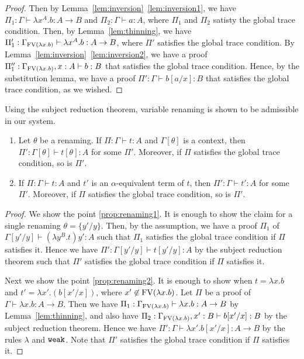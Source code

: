 \begin{proof}
  Then by Lemma~\ref{lem:inversion}~\ref{lem:inversion1},
  we have $\Pi_1:\Gamma \vdash \lambda x^A.b:A\to B$ and $\Pi_2:\Gamma \vdash a:A$,
  where $\Pi_1$ and $\Pi_2$ satisty the global trace condition. 
  Then, by Lemma~\ref{lem:thinning},
  we have $\Pi'_1:\Gamma_{{{\rm FV}}(\lambda x.b)} \vdash \lambda x^A.b:A\to B$,
  where $\Pi'$ satisfies the global trace condition. 
  By Lemma~\ref{lem:inversion}~\ref{lem:inversion2},
  we have a proof $\Pi''_1:\Gamma_{{{\rm FV}}(\lambda x.b)},x:A \vdash b:B$
  that satisfies the global trace condition. 
  Hence, by the substitution lemma, we have a proof $\Pi':\Gamma\vdash b[a/x]:B$
  that satisfies the global trace condition, as we wished. 
\end{proof}

Using the subject reduction theorem, variable renaming is shown to be admissible in our system. 

\begin{proposition}\label{prop:renaming}
  \begin{enumerate}
  \item\label{prop:renaming1}
    Let $\theta$ be a renaming.
    If $\Pi:\Gamma\vdash t:A$ and $\Gamma[\theta]$ is a context, 
    then $\Pi':\Gamma[\theta]\vdash t[\theta]:A$ for some $\Pi'$.
    Moreover, if $\Pi$ satisfies the global trace condition, so is $\Pi'$.
  \item\label{prop:renaming2}
    If $\Pi:\Gamma\vdash t:A$ and $t'$ is an $\alpha$-equivalent term of $t$,
    then $\Pi':\Gamma\vdash t':A$ for some $\Pi'$.
    Moreover, if $\Pi$ satisfies the global trace condition, so is $\Pi'$.
  \end{enumerate}
\end{proposition}


\begin{proof}
  We show the point \ref{prop:renaming1}. 
  It is enough to show the claim for a single renaming $\theta = \{y'/y\}$.
  Then, by the assumption, we have a proof $\Pi_1$ of $\Gamma[y'/y] \vdash (\lambda y^B.t)y':A$
  such that $\Pi_1$ satisfies the global trace condition if $\Pi$ satisfies it.  
  Hence we have $\Pi': \Gamma[y'/y] \vdash t[y'/y]:A$ by the subject reduction theorem
  such that $\Pi'$ satisfies the global trace condition if $\Pi$ satisfies it.

  Next we show the point \ref{prop:renaming2}.
  It is enough to show when $t = \lambda x.b$ and $t' = \lambda x'.(b[x'/x])$, where $x'\not\in{{\rm FV}}(\lambda x.b)$. 
  Let $\Pi$ be a proof of $\Gamma\vdash \lambda x.b:A\to B$.
  Then we have $\Pi_1: \Gamma_{{{\rm FV}}(\lambda x.b)} \vdash \lambda x.b:A\to B$
  by Lemma~\ref{lem:thinning}, and
  also have $\Pi_2: \Gamma_{{{\rm FV}}(\lambda x.b)},x':B \vdash b[x'/x]:B$
  by the subject reduction theorem. 
  Hence we have $\Pi': \Gamma \vdash \lambda x'.b[x'/x]:A\to B$ by the rules $\lambda$ and ${\tt weak}$. 
  Note that $\Pi'$ satisfies the global trace condition if $\Pi$ satisfies it. 
\end{proof}

